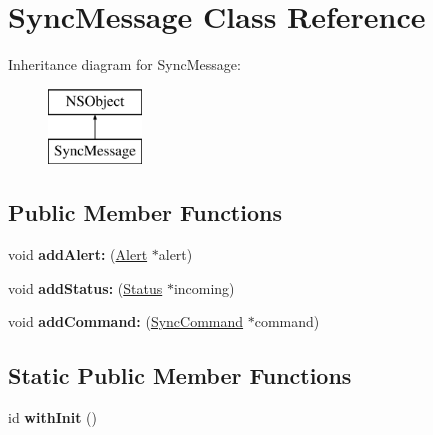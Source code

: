 \hypertarget{interface_sync_message}{
\section{\-Sync\-Message \-Class \-Reference}
\label{interface_sync_message}
}
\-Inheritance diagram for \-Sync\-Message\-:\begin{figure}[H]
\begin{center}
\leavevmode
\includegraphics[height=2.000000cm]{interface_sync_message}
\end{center}
\end{figure}
\subsection*{\-Public \-Member \-Functions}
\begin{DoxyCompactItemize}
\item 
\hypertarget{interface_sync_message_a7ae4a9827fe02f11d1c0c1b19ca4ac28}{
void {\bfseries add\-Alert\-:} (\hyperlink{interface_alert}{\-Alert} $\ast$alert)}
\label{interface_sync_message_a7ae4a9827fe02f11d1c0c1b19ca4ac28}

\item 
\hypertarget{interface_sync_message_ac72485612a6f8e5012c6bd37b235d7be}{
void {\bfseries add\-Status\-:} (\hyperlink{interface_status}{\-Status} $\ast$incoming)}
\label{interface_sync_message_ac72485612a6f8e5012c6bd37b235d7be}

\item 
\hypertarget{interface_sync_message_a8360483ce017b3636854d32de7be4199}{
void {\bfseries add\-Command\-:} (\hyperlink{interface_sync_command}{\-Sync\-Command} $\ast$command)}
\label{interface_sync_message_a8360483ce017b3636854d32de7be4199}

\end{DoxyCompactItemize}
\subsection*{\-Static \-Public \-Member \-Functions}
\begin{DoxyCompactItemize}
\item 
\hypertarget{interface_sync_message_aeee6e93df685f35c19dd1517311b082a}{
id {\bfseries with\-Init} ()}
\label{interface_sync_message_aeee6e93df685f35c19dd1517311b082a}

\end{DoxyCompactItemize}
